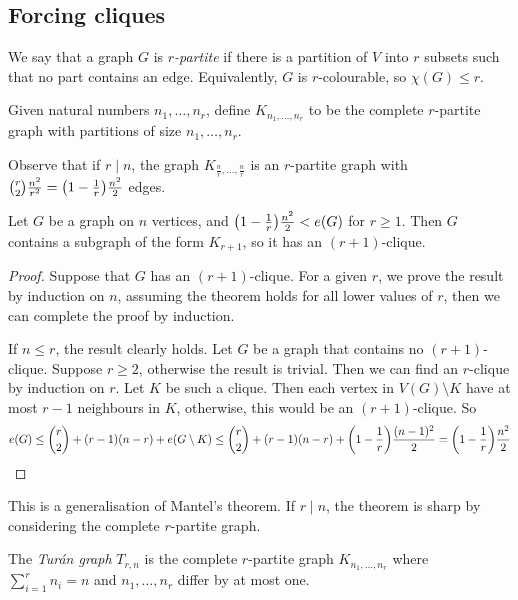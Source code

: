 \subsection{Forcing cliques}
\begin{definition}
	We say that a graph \( G \) is \emph{\( r \)-partite} if there is a partition of \( V \) into \( r \) subsets such that no part contains an edge.
	Equivalently, \( G \) is \( r \)-colourable, so \( \chi(G) \leq r \).
\end{definition}
\begin{definition}
	Given natural numbers \( n_1, \dots, n_r \), define \( K_{n_1, \dots, n_r} \) to be the complete \( r \)-partite graph with partitions of size \( n_1, \dots, n_r \).
\end{definition}
Observe that if \( r \mid n \), the graph \( K_{\frac{n}{r}, \dots, \frac{n}{r}} \) is an \( r \)-partite graph with \( \binom r 2 \frac{n^2}{r^2} = \qty(1 - \frac{1}{r})\frac{n^2}{2} \) edges.
\begin{theorem}
	Let \( G \) be a graph on \( n \) vertices, and \( \qty(1 - \frac{1}{r}) \frac{n^2}{2} < e(G) \) for \( r \geq 1 \).
	Then \( G \) contains a subgraph of the form \( K_{r+1} \), so it has an \( (r + 1) \)-clique.
\end{theorem}
\begin{proof}
	Suppose that \( G \) has an \( (r + 1) \)-clique.
	For a given \( r \), we prove the result by induction on \( n \), assuming the theorem holds for all lower values of \( r \), then we can complete the proof by induction.

	If \( n \leq r \), the result clearly holds.
	Let \( G \) be a graph that contains no \( (r + 1) \)-clique.
	Suppose \( r \geq 2 \), otherwise the result is trivial.
	Then we can find an \( r \)-clique by induction on \( r \).
	Let \( K \) be such a clique.
	Then each vertex in \( V(G) \setminus K \) have at most \( r - 1 \) neighbours in \( K \), otherwise, this would be an \( (r + 1) \)-clique.
	So
	\[ e(G) \leq \binom r 2 + (r - 1)(n - r) + e(G \setminus K) \leq \binom r 2 + (r - 1)(n - r) + \qty(1 - \frac{1}{r})\frac{(n-1)^2}{2} = \qty(1 - \frac{1}{r}) \frac{n^2}{2} \]
\end{proof}
\begin{remark}
	This is a generalisation of Mantel's theorem.
	If \( r \mid n \), the theorem is sharp by considering the complete \( r \)-partite graph.
\end{remark}
\begin{definition}
	The \emph{Tur\'an graph} \( T_{r,n} \) is the complete \( r \)-partite graph \( K_{n_1, \dots, n_r} \) where \( \sum_{i=1}^r n_i = n \) and \( n_1, \dots, n_r \) differ by at most one.
\end{definition}
